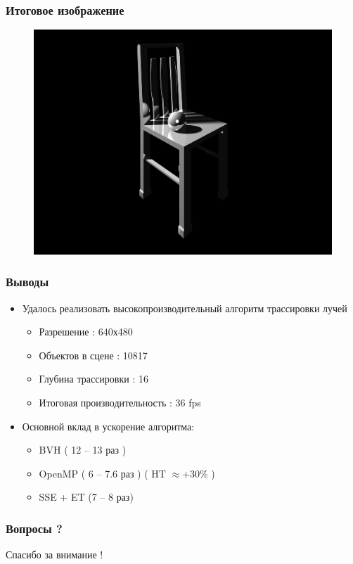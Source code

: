 \documentclass[utf8, 12pt]{beamer}
\begin{document}
\begin{frame}
\frametitle{Итоговое изображение}
\begin{figure}[H]
\centering
\includegraphics[scale=0.16]{imgs/stulb.png}
\end{figure}

\end{frame}

\begin{frame}
\frametitle{Выводы}
\begin{itemize}
\item Удалось реализовать высокопроизводительный алгоритм трассировки лучей
\begin{itemize}
\item Разрешение : 640х480
\item Объектов в сцене : 10817
\item Глубина трассировки : 16 
\item Итоговая производительность : 36 fps
\end{itemize}
\item Основной вклад в ускорение алгоритма:
\begin{itemize}
\item BVH ( 12 -- 13 раз )
\item OpenMP ( 6 -- 7.6 раз ) ( HT $\approx$+30\% )
\item SSE + ET (7 -- 8 раз)
\end{itemize}
\end{itemize}
\end{frame}

\begin{frame}
\frametitle{Вопросы ?}
\begin{center}
{\huge Спасибо за внимание !}
\end{center}
\end{frame}
\end{document}
